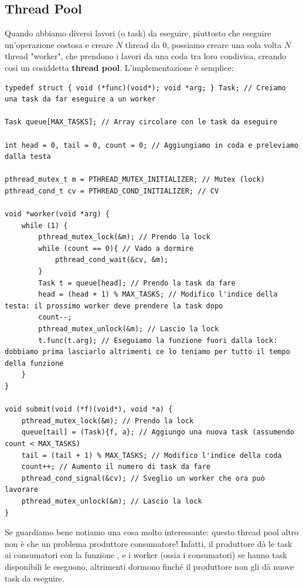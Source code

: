 \documentclass[11pt, a4paper, titlepage, oneside]{scrbook}
\begin{document}
\subsection{Thread Pool}

Quando abbiamo diversi lavori (o task) da eseguire, piuttosto che eseguire un'operazione costosa e creare $N$ thread da 0, possiamo creare una sola volta $N$ thread "worker", che prendono i lavori da una coda tra loro condivisa, creando così un cosiddetta \textbf{thread pool}. L'implementazione è semplice:

\begin{lstlisting}[style=C]
typedef struct { void (*func)(void*); void *arg; } Task; // Creiamo una task da far eseguire a un worker

Task queue[MAX_TASKS]; // Array circolare con le task da eseguire

int head = 0, tail = 0, count = 0; // Aggiungiamo in coda e preleviamo dalla testa

pthread_mutex_t m = PTHREAD_MUTEX_INITIALIZER; // Mutex (lock)
pthread_cond_t cv = PTHREAD_COND_INITIALIZER; // CV

void *worker(void *arg) {
    while (1) {
        pthread_mutex_lock(&m); // Prendo la lock
        while (count == 0){ // Vado a dormire
            pthread_cond_wait(&cv, &m);
        }
        Task t = queue[head]; // Prendo la task da fare 
        head = (head + 1) % MAX_TASKS; // Modifico l'indice della testa: il prossimo worker deve prendere la task dopo
        count--; 
        pthread_mutex_unlock(&m); // Lascio la lock
        t.func(t.arg); // Eseguiamo la funzione fuori dalla lock: dobbiamo prima lasciarlo altrimenti ce lo teniamo per tutto il tempo della funzione
    }
}

void submit(void (*f)(void*), void *a) {
    pthread_mutex_lock(&m); // Prendo la lock
    queue[tail] = (Task){f, a}; // Aggiungo una nuova task (assumendo count < MAX_TASKS)
    tail = (tail + 1) % MAX_TASKS; // Modifico l'indice della coda
    count++; // Aumento il numero di task da fare
    pthread_cond_signal(&cv); // Sveglio un worker che ora può lavorare
    pthread_mutex_unlock(&m); // Lascio la lock
}
\end{lstlisting}

Se guardiamo bene notiamo una cosa molto interessante: questo thread pool altro non è che un problema produttore consumatore! Infatti, il produttore dà le task ai consumatori con la funzione , e i worker (ossia i consumatori) se hanno task disponibili le eseguono, altrimenti dormono finché il produttore non gli dà nuove task da eseguire. 
\end{document}
